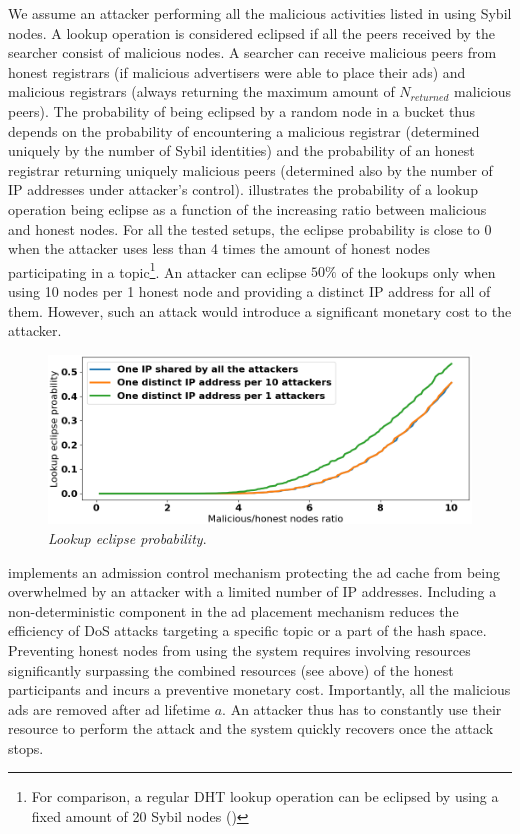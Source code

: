 We assume an attacker performing all the malicious activities listed in  using Sybil nodes. A lookup operation is considered eclipsed if all the peers received by the searcher consist of malicious nodes. A searcher can receive malicious peers from honest registrars (if malicious advertisers were able to place their ads) and malicious registrars (always returning the maximum amount of $N_\textit{returned}$ malicious peers). The probability of being eclipsed by a random node in a bucket thus depends on the probability of encountering a malicious registrar (determined uniquely by the number of Sybil identities) and the probability of an honest registrar returning uniquely malicious peers (determined also by the number of IP addresses under attacker's control).  illustrates the probability of a lookup operation being eclipse as a function of the increasing ratio between malicious and honest nodes. For all the tested setups, the eclipse probability is close to $0$ when the attacker uses less than 4 times the amount of honest nodes participating in a topic\footnote{For comparison, a regular DHT lookup operation can be eclipsed by using a fixed amount of 20 Sybil nodes ()}. An attacker can eclipse $50\%$  of the lookups only when using 10 nodes per 1 honest node and providing a distinct IP address for all of them. However, such an attack would introduce a significant monetary cost to the attacker.

\begin{figure}[t]
    \includegraphics[width=1\linewidth]{img/eclipse_probability}
    \caption{\emph{Lookup eclipse probability}.
    }
    \label{fig:eclipse_probability}
\end{figure}

\sysname implements an admission control mechanism protecting the ad cache from being overwhelmed by an attacker with a limited number of IP addresses. Including a non-deterministic component in the ad placement mechanism reduces the efficiency of DoS attacks targeting a specific topic or a part of the hash space. Preventing honest nodes from using the system requires involving resources significantly surpassing the combined resources (see above) of the honest participants and incurs a preventive monetary cost. Importantly, all the malicious ads are removed after ad lifetime $a$. An attacker thus has to constantly use their resource to perform the attack and the system quickly recovers once the attack stops.